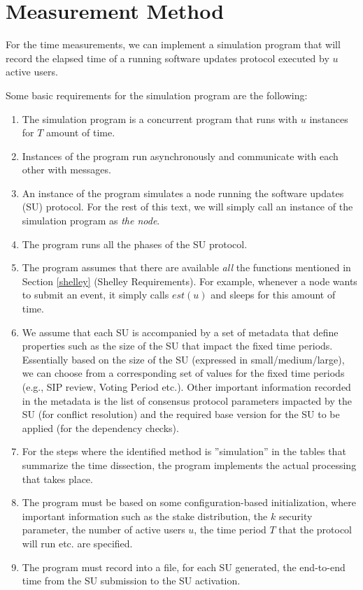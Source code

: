 \section{Measurement Method}
For the time measurements, we can implement a simulation program that will record the elapsed time of a running software updates protocol executed by $u$ active users.

Some basic requirements for the simulation program are the following:
\begin{enumerate}
\item The simulation program is a concurrent program that runs with $u$ instances for $T$ amount of time.
\item Instances of the program run asynchronously and communicate with each other with messages.
\item An instance of the program simulates a node running the software updates (SU) protocol. For the rest of this text, we will simply call an instance of the simulation program as \emph{the node}.
\item The program runs all the phases of the SU protocol.
\item The program assumes that there are available \emph{all} the functions mentioned in Section \ref{shelley} (Shelley Requirements). For example, whenever a node wants to submit an event, it simply calls $est(u)$ and sleeps for this amount of time.
\item We assume that each SU is accompanied by a set of metadata that define properties such as the size of the SU that impact the fixed time periods. Essentially based on the size of the SU (expressed in small/medium/large), we can choose from a corresponding set of values for the fixed time periods (e.g., SIP review, Voting Period etc.). Other important information recorded in the metadata is the list of consensus protocol parameters impacted by the SU (for conflict resolution) and the required base version for the SU to be applied (for the dependency checks).
\item For the steps where the identified method is ''simulation'' in the tables that summarize the time dissection, the program implements the actual processing that takes place.
\item The program must be based on some configuration-based initialization, where important information such as the stake distribution, the $k$ security parameter, the number of active users $u$, the time period $T$ that the protocol will run etc. are specified.
\item The program must record into a file, for each SU generated, the end-to-end time from the SU submission to the SU activation.
\end{enumerate}